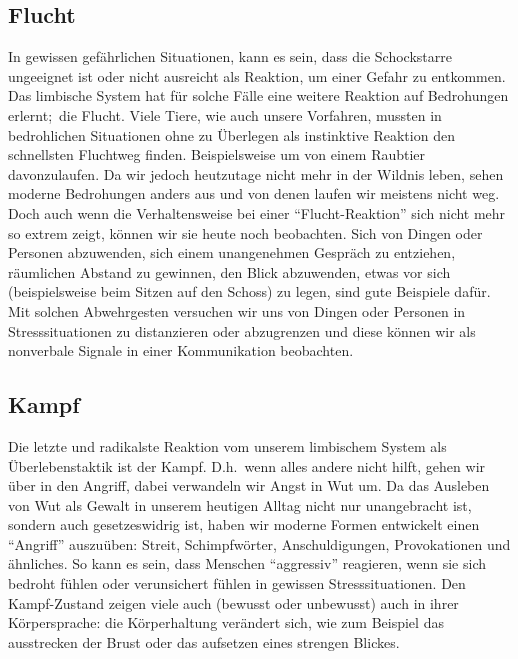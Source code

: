 \subsection{Flucht}\label{subsec:flucht}
In gewissen gefährlichen Situationen, kann es sein, dass die Schockstarre ungeeignet ist oder nicht ausreicht als Reaktion,
um einer Gefahr zu entkommen.
Das limbische System hat für solche Fälle eine weitere Reaktion auf Bedrohungen erlernt;\ die Flucht.
Viele Tiere, wie auch unsere Vorfahren, mussten in bedrohlichen Situationen ohne zu Überlegen als instinktive Reaktion
den schnellsten Fluchtweg finden.
Beispielsweise um von einem Raubtier davonzulaufen.
Da wir jedoch heutzutage nicht mehr in der Wildnis leben, sehen moderne Bedrohungen anders aus und von denen laufen wir meistens nicht weg.
Doch auch wenn die Verhaltensweise bei einer ``Flucht-Reaktion'' sich nicht mehr so extrem zeigt, können wir sie heute noch beobachten.
Sich von Dingen oder Personen abzuwenden, sich einem unangenehmen Gespräch zu entziehen, räumlichen Abstand zu gewinnen, den Blick abzuwenden,
etwas vor sich (beispielsweise beim Sitzen auf den Schoss) zu legen, sind gute Beispiele dafür.
Mit solchen Abwehrgesten versuchen wir uns von Dingen oder Personen in Stresssituationen zu distanzieren oder abzugrenzen und diese können wir
als nonverbale Signale in einer Kommunikation beobachten.

\subsection{Kampf}\label{subsec:kampf}
Die letzte und radikalste Reaktion vom unserem limbischem System als Überlebenstaktik ist der Kampf.
D.h.\ wenn alles andere nicht hilft, gehen wir über in den Angriff, dabei verwandeln wir Angst in Wut um.
Da das Ausleben von Wut als Gewalt in unserem heutigen Alltag nicht nur unangebracht ist, sondern auch gesetzeswidrig ist,
haben wir moderne Formen entwickelt einen ``Angriff'' auszuüben: Streit, Schimpfwörter, Anschuldigungen, Provokationen und ähnliches.
So kann es sein, dass Menschen ``aggressiv'' reagieren, wenn sie sich bedroht fühlen oder verunsichert fühlen in gewissen Stresssituationen.
Den Kampf-Zustand zeigen viele auch (bewusst oder unbewusst) auch in ihrer Körpersprache: die Körperhaltung
verändert sich, wie zum Beispiel das ausstrecken der Brust oder das aufsetzen eines strengen Blickes.
